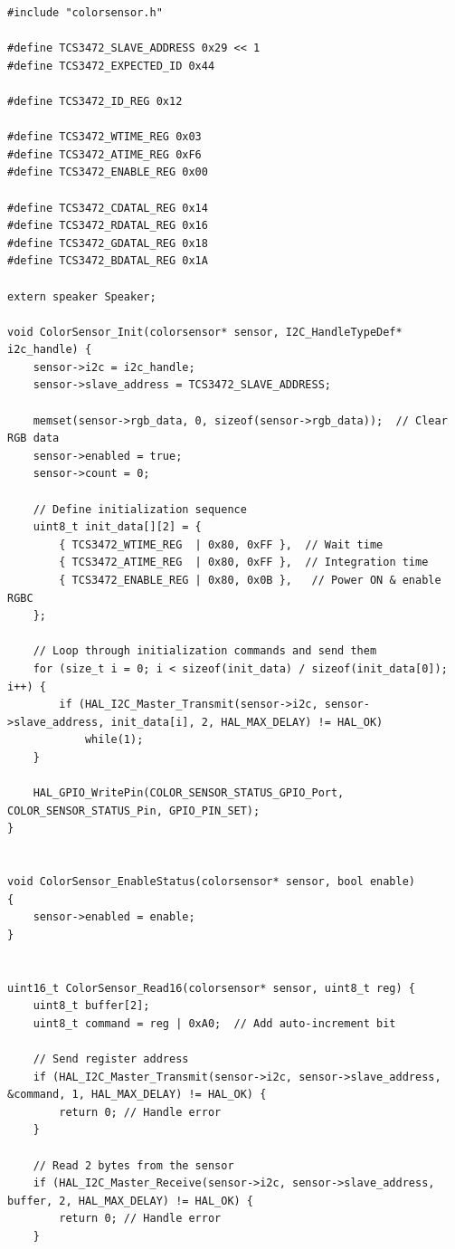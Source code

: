 \documentclass{article}
\begin{document}
\begin{lstlisting}[caption={STM32 TCS34725 Firmware Implementation}, label={lst:stm32_colorsensor_code}]
#include "colorsensor.h"

#define TCS3472_SLAVE_ADDRESS 0x29 << 1
#define TCS3472_EXPECTED_ID 0x44

#define TCS3472_ID_REG 0x12

#define TCS3472_WTIME_REG 0x03
#define TCS3472_ATIME_REG 0xF6
#define TCS3472_ENABLE_REG 0x00

#define TCS3472_CDATAL_REG 0x14
#define TCS3472_RDATAL_REG 0x16
#define TCS3472_GDATAL_REG 0x18
#define TCS3472_BDATAL_REG 0x1A

extern speaker Speaker;

void ColorSensor_Init(colorsensor* sensor, I2C_HandleTypeDef* i2c_handle) {
    sensor->i2c = i2c_handle;
    sensor->slave_address = TCS3472_SLAVE_ADDRESS;

    memset(sensor->rgb_data, 0, sizeof(sensor->rgb_data));  // Clear RGB data
    sensor->enabled = true;
    sensor->count = 0;

    // Define initialization sequence
    uint8_t init_data[][2] = {
        { TCS3472_WTIME_REG  | 0x80, 0xFF },  // Wait time
        { TCS3472_ATIME_REG  | 0x80, 0xFF },  // Integration time
        { TCS3472_ENABLE_REG | 0x80, 0x0B },   // Power ON & enable RGBC
    };

    // Loop through initialization commands and send them
    for (size_t i = 0; i < sizeof(init_data) / sizeof(init_data[0]); i++) {
        if (HAL_I2C_Master_Transmit(sensor->i2c, sensor->slave_address, init_data[i], 2, HAL_MAX_DELAY) != HAL_OK)
        	while(1);
    }

    HAL_GPIO_WritePin(COLOR_SENSOR_STATUS_GPIO_Port, COLOR_SENSOR_STATUS_Pin, GPIO_PIN_SET);
}


void ColorSensor_EnableStatus(colorsensor* sensor, bool enable)
{
	sensor->enabled = enable;
}


uint16_t ColorSensor_Read16(colorsensor* sensor, uint8_t reg) {
    uint8_t buffer[2];
    uint8_t command = reg | 0xA0;  // Add auto-increment bit

    // Send register address
    if (HAL_I2C_Master_Transmit(sensor->i2c, sensor->slave_address, &command, 1, HAL_MAX_DELAY) != HAL_OK) {
        return 0; // Handle error
    }

    // Read 2 bytes from the sensor
    if (HAL_I2C_Master_Receive(sensor->i2c, sensor->slave_address, buffer, 2, HAL_MAX_DELAY) != HAL_OK) {
        return 0; // Handle error
    }


\end{lstlisting}
\end{document}
